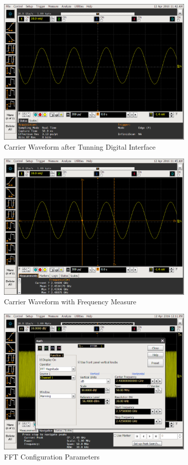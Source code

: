\begin{figure}[htbp]
    \centering
    \includegraphics[width=0.85\textwidth]{./figures/oscill_dig}
    \caption{ Carrier Waveform after Tunning Digital Interface
    \label{fig:oscilldig}}
\end{figure}

\begin{figure}[htbp]
    \centering
    \includegraphics[width=0.85\textwidth]{./figures/oscill_freq}
    \caption{ Carrier Waveform with Frequency Measure
    \label{fig:oscillfreq}}
\end{figure}

\begin{figure}[htbp]
    \centering
    \includegraphics[width=0.85\textwidth]{./figures/oscill_fftcf}
    \caption{ FFT Configuration Parameters
    \label{fig:oscillfftcf}}
\end{figure}

